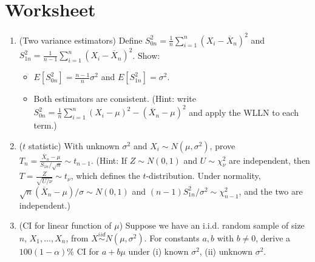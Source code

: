 \documentclass[12pt]{article}
\begin{document}
\section*{Worksheet}



\begin{enumerate}\itemsep1.2em

\item (Two variance estimators) Define
$S_{0n}^2=\frac{1}{n}\sum_{i=1}^n (X_i-\overline{X}_n)^2$ and
$S_{1n}^2=\frac{1}{n-1}\sum_{i=1}^n (X_i-\overline{X}_n)^2$. Show:
\begin{itemize}
    \item[i)] $E[S_{0n}^2]=\frac{n-1}{n}\sigma^2$ and $E[S_{1n}^2]=\sigma^2$.
    \item[ii)] Both estimators are consistent. (Hint: write $S_{0n}^2=\frac{1}{n}\sum_{i=1}^n(X_i-\mu)^2-(\overline{X}_n-\mu)^2$ and apply the WLLN to each term.)
\end{itemize}
\vspace{18em}


\item ($t$ statistic) With unknown $\sigma^2$ and $X_i\sim N(\mu,\sigma^2)$, prove
$T_n=\frac{\overline{X}_n-\mu}{S_{1n}/\sqrt{n}} \sim t_{n-1}.$
(Hint: If $Z \sim N(0,1)$ and $U \sim \chi^2_\nu$ are independent, then
$T = \frac{Z}{\sqrt{U/\nu}} \sim t_\nu$, which defines the $t$-distribution. Under normality, $\sqrt{n}(\overline{X}_n-\mu)/\sigma \sim N(0,1)$ and $(n-1)S_{1n}^2/\sigma^2\sim \chi^2_{n-1}$, and the two are independent.)
\vspace{20em}


\item (CI for linear function of $\mu$) Suppose we have an i.i.d. random sample of size $n$, $X_1,...,X_n$, from $X \stackrel{iid}{\sim} N(\mu,\sigma^2)$. For constants $a,b$ with $b\neq0$, derive a $100(1-\alpha)\%$ CI for $a+b\mu$ under (i) known $\sigma^2$, (ii) unknown $\sigma^2$.

\end{enumerate}
\end{document}
